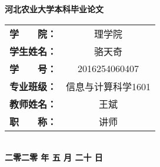 \begin{center}
    \vspace{2cm}
    \begin{spacing}{2.0}
        \textbf{河北农业大学本科毕业论文}
    \end{spacing}
    \vfill
    \songti
    \begin{tabular}[b]{cc}
        \rule{0pt}{1cm}\textbf{学　　院：} & 理学院             \\\cline{2-2}
        \rule{0pt}{1cm}\textbf{学生姓名：} & 骆天奇             \\\cline{2-2}
        \rule{0pt}{1cm}\textbf{学　　号：} & 2016254060407      \\\cline{2-2}
        \rule{0pt}{1cm}\textbf{专业班级：} & 信息与计算科学1601 \\\cline{2-2}
        \rule{0pt}{1cm}\textbf{教师姓名：} & 王斌               \\\cline{2-2}
        \rule{0pt}{1cm}\textbf{职　　称：} & 讲师               \\\cline{2-2}
    \end{tabular}
    \\
    \vspace{4cm}
    \textbf{二零二零 年 五 月 二十 日}
    \vspace{2cm}
\end{center}
\clearpage